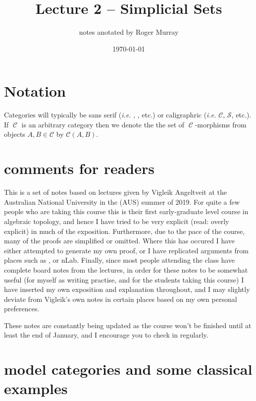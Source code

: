 \documentclass{amsart}
\newcommand{\catname}[1]{{\sffamily\upshape{{#1}}}}
\newcommand{\sset}{\catname{sSet}}
\newcommand{\topp}{\catname{Top}}
\DeclareMathOperator{\calC}{\mathcal{C}}
\theoremstyle{definition}
\begin{document}
\title{Lecture 2 -- Simplicial Sets}
\author{notes anotated by Roger Murray}
\date{\today}

\maketitle
\section{Notation}
Categories will typically be sans serif (\textit{i.e.} \topp, \sset, etc.) or caligraphric
(\textit{i.e.} $\mathcal{C}$, $\mathcal{S}$, etc.).
If $\calC$ is an arbitrary category then we denote the the set of $\calC$-morphisms from
objects $A,B\in \mathcal{C}$ by $\mathcal{C}(A,B)$.

\section{comments for readers}
This is a set of notes based on lectures given by Vigleik Angeltveit at
the Australian National University in the (AUS) summer of 2019.
For quite a few people who are taking this course this is their first
early-graduate level course in algebraic topology, and hence I have
tried to be very explicit (read: overly explicit) in much of the exposition.
Furthermore, due to the pace of the course, many of the proofs are simplified
or omitted. Where this has occured I have either attempted to generate my own
proof, or I have replicated arguments from places such as \cite{Hov},
\cite{Lur}
or nLab. Finally, since most people attending the class have complete
board notes from the lectures, in order for these notes to be somewhat useful
(for myself as writing practise, and for the students taking this course)
I have inserted my own exposition and explanation throughout, and
I may slightly deviate from Vigleik's own notes in certain places
based on my own personal preferences.

These notes are constantly being updated as the course won't be finished
until at least the end of January, and I encourage you to check in regularly. 
\section{model categories and some classical examples}
\end{document}
